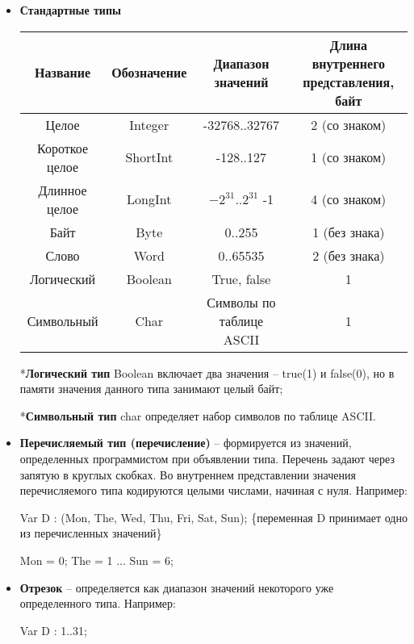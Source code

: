 \begin{itemize}

\item {\bf{Стандартные типы}}

{\normalsize
\begin{center}
\begin{tabular}{ | c | c | c | c | }
\hline
Название & Обозначение & Диапазон значений & Длина внутреннего представления, байт\\
\hline
Целое & Integer & -32768..32767 & 2 (со знаком) \\
\hline
Короткое целое & ShortInt & -128..127 & 1 (со знаком) \\
\hline
Длинное целое & LongInt & $-2^{31}$..$2^{31}$ -1 & 4 (со знаком) \\
\hline
Байт & Byte & 0..255 & 1 (без знака) \\
\hline
Слово & Word & 0..65535 & 2 (без знака) \\
\hline
Логический & Boolean & True, false & 1 \\ 
\hline
Символьный & Char & Символы по таблице ASCII & 1\\
\hline
\end{tabular}
\end{center}
}

*{\bf{Логический тип}} Boolean включает два значения – true(1) и false(0), но в памяти значения данного типа занимают целый байт;

*{\bf{Символьный тип}} char определяет набор символов по таблице ASCII. 

\item {\bf{Перечисляемый тип (перечисление)}} 
– формируется из значений, определенных программистом при объявлении типа. Перечень задают через запятую в круглых скобках. Во внутреннем представлении значения перечисляемого типа кодируются целыми числами, начиная с нуля. Например:


Var D : (Mon, The, Wed, Thu, Fri, Sat, Sun);   \{переменная D принимает одно из перечисленных значений\}

Mon = 0; The = 1 ... Sun = 6;

\item {\bf{Отрезок}}
– определяется как диапазон значений некоторого уже определенного типа. Например: 

Var D : 1..31;


\end{itemize}
